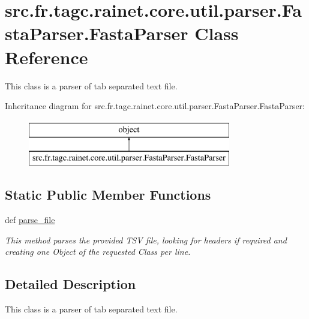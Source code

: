 \hypertarget{classsrc_1_1fr_1_1tagc_1_1rainet_1_1core_1_1util_1_1parser_1_1FastaParser_1_1FastaParser}{\section{src.\-fr.\-tagc.\-rainet.\-core.\-util.\-parser.\-Fasta\-Parser.\-Fasta\-Parser Class Reference}
\label{classsrc_1_1fr_1_1tagc_1_1rainet_1_1core_1_1util_1_1parser_1_1FastaParser_1_1FastaParser}
}


This class is a parser of tab separated text file.  


Inheritance diagram for src.\-fr.\-tagc.\-rainet.\-core.\-util.\-parser.\-Fasta\-Parser.\-Fasta\-Parser\-:\begin{figure}[H]
\begin{center}
\leavevmode
\includegraphics[height=2.000000cm]{classsrc_1_1fr_1_1tagc_1_1rainet_1_1core_1_1util_1_1parser_1_1FastaParser_1_1FastaParser}
\end{center}
\end{figure}
\subsection*{Static Public Member Functions}
\begin{DoxyCompactItemize}
\item 
def \hyperlink{classsrc_1_1fr_1_1tagc_1_1rainet_1_1core_1_1util_1_1parser_1_1FastaParser_1_1FastaParser_aa8e952bd3fba70c0f1e6936f72a30bc2}{parse\-\_\-file}
\begin{DoxyCompactList}\small\item\em This method parses the provided T\-S\-V file, looking for headers if required and creating one Object of the requested Class per line. \end{DoxyCompactList}\end{DoxyCompactItemize}


\subsection{Detailed Description}
This class is a parser of tab separated text file. 

